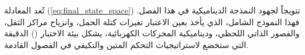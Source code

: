 تُعد المعادلة (\ref{eq:final_state_space}) تتويجاً لجهود النمذجة الديناميكية في هذا الفصل. فهذا النموذج الشامل، الذي يأخذ بعين الاعتبار تغيرات كتلة الحمل، وانزياح مراكز الثقل، والقصور الذاتي اللحظي، وديناميكية المحركات الكهربائية، يشكل بيئة الاختبار () الدقيقة التي ستخضع لاستراتيجيات التحكم المتين والتكيفي في الفصول القادمة.